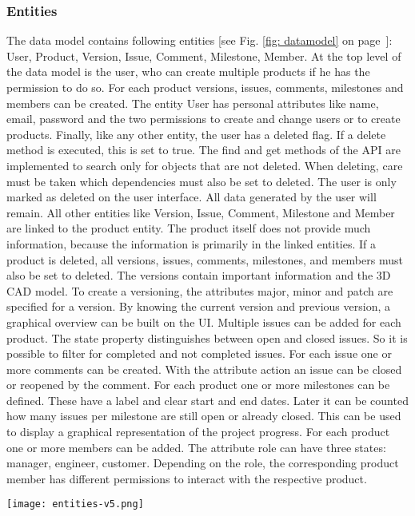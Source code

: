     \subsubsection*{Entities} 
    The data model contains following entities [see Fig. \ref{fig: datamodel} on page~\pageref{fig: datamodel}]: User, Product, Version, Issue, Comment, Milestone, Member. At the top level of the data model is the user, who can create multiple products if he has the permission to do so. For each product versions, issues, comments, milestones and members can be created. The entity User has personal attributes like name, email, password and the two permissions to create and change users or to create products. Finally, like any other entity, the user has a deleted flag. If a delete method is executed, this is set to true. The find and get methods of the API are implemented to search only for objects that are not deleted. When deleting, care must be taken which dependencies must also be set to deleted. The user is only marked as deleted on the user interface. All data generated by the user will remain. All other entities like Version, Issue, Comment, Milestone and Member are linked to the product entity. The product itself does not provide much information, because the information is primarily in the linked entities. If a product is deleted, all versions, issues, comments, milestones, and members must also be set to deleted. The versions contain important information and the 3D CAD model. To create a versioning, the attributes major, minor and patch are specified for a version. By knowing the current version and previous version, a graphical overview can be built on the UI. Multiple issues can be added for each product. The state property distinguishes between open and closed issues. So it is possible to filter for completed and not completed issues. For each issue one or more comments can be created. With the attribute action an issue can be closed or reopened by the comment. For each product one or more milestones can be defined. These have a label and clear start and end dates. Later it can be counted how many issues per milestone are still open or already closed. This can be used to display a graphical representation of the project progress. For each product one or more members can be added. The attribute role can have three states: manager, engineer, customer. Depending on the role, the corresponding product member has different permissions to interact with the respective product.

    \begin{figure*}[t]
        \centering
        \texttt{[image: entities-v5.png]}
        \caption{Data model}
        \label{fig: datamodel}
    \end{figure*}

